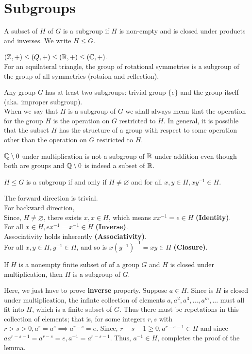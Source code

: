 \section{Subgroups}
\begin{definition}[Subgroup]
    A subset of $H$ of $G$ is a subgroup if $H$ is non-empty and is closed under products and inverses. We write $H \le G$.
\end{definition}
\begin{eg}
    $(\mathbb{Z}, +) \le (Q, +) \le (\mathbb{R}, +) \le (\mathbb{C}, +).$\\
    For an equilateral triangle, the group of rotational symmetries is a subgroup of the group of all symmetries (rotaion and reflection).
\end{eg}
Any group $G$ has at least two subgroups: trivial group $\{e\}$ and the group itself (aka. improper subgroup).\\
When we say that $H$ is a subgroup of $G$ we shall always mean that the operation for the group $H$ is the operation on $G$ restricted to $H$. In general, it is possible that the subset $H$ has the structure of a group with respect to some operation other than the operation on $G$ restricted to $H$.
\begin{eg}
    $\mathbb{Q} \setminus {0}$ under multiplication is not a subgroup of $\mathbb{R}$ under addition even though both are groups and $\mathbb{Q} \setminus {0}$ is indeed a subset of $\mathbb{R}$.
\end{eg}
\begin{lemma}
    $H \le G$ is a subgroup if and only if $H \neq \varnothing$ and for all $x, y \in H, xy^{-1} \in H.$
\end{lemma}
\begin{lemmaproof}
    The forward direction is trivial.\\
    For backward direction,\\
    Since, $H \neq \varnothing$, there exists $x, x \in H$, which means $xx^{-1} = e \in H$ \textbf{(Identity)}.\\
    For all $x \in H, ex^{-1} = x^{-1} \in H$ \textbf{(Inverse)}.\\
    Associativity holds inherently \textbf{(Associativity)}.\\
    For all $x, y \in H, y^{-1} \in H$, and so is $x(y^{-1})^{-1} = x  y \in H$ \textbf{(Closure)}.
\end{lemmaproof}
\begin{lemma}
    If $H$ is a nonempty finite subset of of a group $G$ and $H$ is closed under multiplication, then $H$ is a subgroup of $G$.
\end{lemma}
\begin{lemmaproof}
    Here, we just have to prove \textbf{inverse} property. Suppose $a \in H$. Since is $H$ is closed under multiplication, the infinte collection of elements $a, a^2, a^3, ..., a^m, ...$ must all fit into $H$, which is a finite subset of $G$. Thus there must be repetations in this collection of elements; that is, for some integers $r, s$ with $r > s > 0, a^r = a^s \implies a^{r-s} = e$. Since, $r - s - 1 \ge 0, a^{r-s-1} \in H$ and since $aa^{r-s-1} = a^{r-s} = e, a^{-1} = a^{r-s-1}$. Thus, $a^{-1} \in H$, completes the proof of the lemma.
\end{lemmaproof}